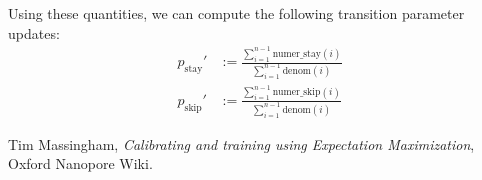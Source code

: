 \documentclass{article}
\newcommand{\pstay}{\ensuremath{p_\mathrm{stay}}}
\newcommand{\pskip}{\ensuremath{p_\mathrm{skip}}}
\begin{document}
Using these quantities, we can compute the following transition parameter updates:
\begin{align*}
\pstay' & := \frac{\sum_{i=1}^{n-1} \mathrm{numer\_stay}(i)}{\sum_{i=1}^{n-1} \mathrm{denom}(i)}
\\
\pskip' & := \frac{\sum_{i=1}^{n-1} \mathrm{numer\_skip}(i)}{\sum_{i=1}^{n-1} \mathrm{denom}(i)}
\end{align*}

\begin{thebibliography}{9}

  Tim Massingham,
  \emph{Calibrating and training using Expectation Maximization},
  Oxford Nanopore Wiki.

\end{thebibliography}
\end{document}
